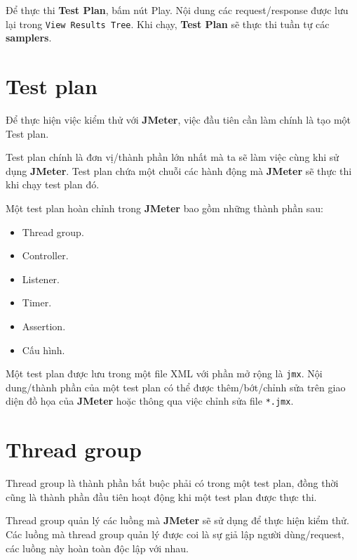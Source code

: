 \documentclass[12pt]{report}
\newcommand{\jmeter}{\textbf{JMeter}}
\begin{document}
\par Để thực thi \textbf{Test Plan}, bấm nút Play. Nội dung các request/response được lưu lại trong \texttt{View Results Tree}. Khi chạy, \textbf{Test Plan} sẽ thực thi tuần tự các \textbf{samplers}.

\section{Test plan}

\par Để thực hiện việc kiểm thử với \jmeter{}, việc đầu tiên cần làm chính là tạo một Test plan.

\par Test plan chính là đơn vị/thành phần lớn nhất mà ta sẽ làm việc cùng khi sử dụng \jmeter{}. Test plan chứa một chuỗi các hành động mà \jmeter{} sẽ thực thi khi chạy test plan đó.

\par Một test plan hoàn chỉnh trong \jmeter{} bao gồm những thành phần sau:
\begin{itemize}[itemsep=0pt]
    \item Thread group.
    \item Controller.
    \item Listener.
    \item Timer.
    \item Assertion.
    \item Cấu hình.
\end{itemize}

\par Một test plan được lưu trong một file XML với phần mở rộng là \texttt{jmx}. Nội dung/thành phần của một test plan có thể được thêm/bớt/chỉnh sửa trên giao diện đồ họa của \jmeter{} hoặc thông qua việc chỉnh sửa file \texttt{*.jmx}.

\section{Thread group}

\par Thread group là thành phần bắt buộc phải có trong một test plan, đồng thời cũng là thành phần đầu tiên hoạt động khi một test plan được thực thi.

\par Thread group quản lý các luồng mà \jmeter{} sẽ sử dụng để thực hiện kiểm thử. Các luồng mà thread group quản lý được coi là sự giả lập người dùng/request, các luồng này hoàn toàn độc lập với nhau.
\end{document}
